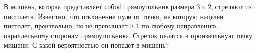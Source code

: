 \documentclass{article}
\begin{document}
В мишень, которая представляет собой прямоугольник размера $3\times 2$, стреляют из пистолета.
Известно, что отклонение пули от точки, на которую нацелен пистолет, произвольно, но не превышает $0,1$ по любому направлению, параллельному сторонам прямоугольника.
Стрелок целится в произвольную точку мишени. С какой вероятностью он попадет в мишень?
\end{document}
